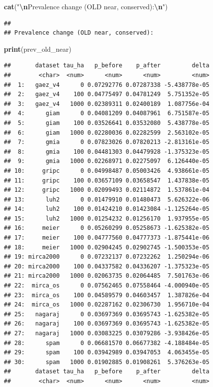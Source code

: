 \documentclass[
  11pt,
]{article}
\newenvironment{Shaded}{\begin{snugshade}}{\end{snugshade}}
\newcommand{\FunctionTok}[1]{\textcolor[rgb]{0.13,0.29,0.53}{\textbf{#1}}}
\newcommand{\NormalTok}[1]{#1}
\newcommand{\SpecialCharTok}[1]{\textcolor[rgb]{0.81,0.36,0.00}{\textbf{#1}}}
\newcommand{\StringTok}[1]{\textcolor[rgb]{0.31,0.60,0.02}{#1}}
\begin{document}
\begin{Shaded}
\begin{Highlighting}[]
\FunctionTok{cat}\NormalTok{(}\StringTok{"}\SpecialCharTok{\textbackslash{}n}\StringTok{Prevalence change (OLD near, conserved):}\SpecialCharTok{\textbackslash{}n}\StringTok{"}\NormalTok{)}
\end{Highlighting}
\end{Shaded}

\begin{verbatim}
## 
## Prevalence change (OLD near, conserved):
\end{verbatim}

\begin{Shaded}
\begin{Highlighting}[]
\FunctionTok{print}\NormalTok{(prev\_old\_near)}
\end{Highlighting}
\end{Shaded}

\begin{verbatim}
##       dataset tau_ha   p_before    p_after         delta
##        <char>  <num>      <num>      <num>         <num>
##  1:   gaez_v4      0 0.07292776 0.07287338 -5.438778e-05
##  2:   gaez_v4    100 0.04775497 0.04781249  5.751352e-05
##  3:   gaez_v4   1000 0.02389311 0.02400189  1.087756e-04
##  4:      giam      0 0.04081209 0.04087961  6.751587e-05
##  5:      giam    100 0.03526641 0.03532080  5.438778e-05
##  6:      giam   1000 0.02280036 0.02282599  2.563102e-05
##  7:      gmia      0 0.07823026 0.07820213 -2.813161e-05
##  8:      gmia    100 0.04481303 0.04479928 -1.375323e-05
##  9:      gmia   1000 0.02268971 0.02275097  6.126440e-05
## 10:     gripc      0 0.04998487 0.05003426  4.938661e-05
## 11:     gripc    100 0.03657109 0.03658547  1.437838e-05
## 12:     gripc   1000 0.02099493 0.02114872  1.537861e-04
## 13:      luh2      0 0.01479910 0.01480473  5.626322e-06
## 14:      luh2    100 0.01424210 0.01423084 -1.125264e-05
## 15:      luh2   1000 0.01254232 0.01256170  1.937955e-05
## 16:     meier      0 0.05260299 0.05258673 -1.625382e-05
## 17:     meier    100 0.04777560 0.04777373 -1.875441e-06
## 18:     meier   1000 0.02904245 0.02902745 -1.500353e-05
## 19: mirca2000      0 0.07232137 0.07232262  1.250294e-06
## 20: mirca2000    100 0.04337582 0.04336207 -1.375323e-05
## 21: mirca2000   1000 0.02063735 0.02064485  7.501763e-06
## 22:  mirca_os      0 0.07562465 0.07558464 -4.000940e-05
## 23:  mirca_os    100 0.04589579 0.04603457  1.387826e-04
## 24:  mirca_os   1000 0.02287162 0.02306730  1.956710e-04
## 25:   nagaraj      0 0.03697369 0.03695743 -1.625382e-05
## 26:   nagaraj    100 0.03697369 0.03695743 -1.625382e-05
## 27:   nagaraj   1000 0.03083225 0.03079286 -3.938426e-05
## 28:      spam      0 0.06681570 0.06677382 -4.188484e-05
## 29:      spam    100 0.03942989 0.03947053  4.063455e-05
## 30:      spam   1000 0.01902885 0.01908261  5.376263e-05
##       dataset tau_ha   p_before    p_after         delta
##        <char>  <num>      <num>      <num>         <num>
\end{verbatim}
\end{document}
